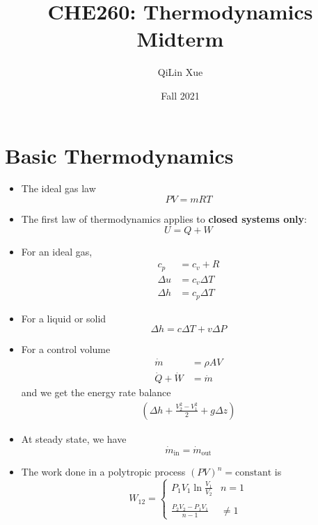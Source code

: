 \documentclass{article}
\title{CHE260: Thermodynamics Midterm}
\author{QiLin Xue}
\date{Fall 2021}
\begin{document}
\maketitle
\section{Basic Thermodynamics}
\begin{itemize}
    \item The ideal gas law 
    \begin{equation}
        PV = mRT
    \end{equation}
    \item The first law of thermodynamics applies to \textbf{closed systems only}:
    \begin{equation}
        U = Q + W
    \end{equation}
    \item For an ideal gas,
    \begin{align}
        c_p &= c_v + R \\ 
        \Delta u &= c_v\Delta T \\ 
        \Delta h &= c_p\Delta T 
    \end{align}
    \item For a liquid or solid 
    \begin{equation}
        \Delta h = c\Delta T + v\Delta P
    \end{equation}
    \item For a control volume 
    \begin{align}
        \dot{m} &= \rho A V \\ 
        \dot{Q} + \dot{W} &= \dot{m}
    \end{align}
    and we get the energy rate balance 
    \begin{align}
        \left(\Delta h + \frac{V_2^2-V_1^2}{2}+g\Delta z\right)
    \end{align}
    \item At steady state, we have
    \begin{equation}
        \dot{m}_\text{in} = \dot{m}_\text{out}
    \end{equation}
    \item The work done in a polytropic process $(PV)^n=\text{constant}$ is 
    \begin{equation}
        W_{12} = \begin{cases}
            P_1V_1\ln\frac{V_1}{V_2} & n=1 \\ \\
            \frac{P_2V_2-P_1V_1}{n-1} & \neq 1
        \end{cases}
    \end{equation}
\end{itemize}
\end{document}
